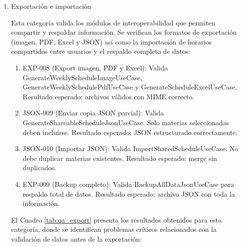 \begin{enumerate}
  Para conflictos permitidos se establece una penalización moderada de 50 puntos (ALLOWED\_CONFLICT\_PENALTY) que reduce la puntuación pero mantiene la combinación como opción válida. Adicionalmente, se aumenta el peso de la estrategia PrioritizeTeachersStrategy de 1.0 a 2.0 para que los docentes favoritos tengan mayor influencia en el ranking final.
  
  \item Exportación e importación
  
  Esta categoría valida los módulos de interoperabilidad que permiten compartir y respaldar información. Se verifican los formatos de exportación (imagen, PDF, Excel y JSON) así como la importación de horarios compartidos entre usuarios y el respaldo completo de datos:
  
  \begin{enumerate}[label=\alph*)]
    \item EXP-008 (Export imagen, PDF y Excel): Valida GenerateWeeklyScheduleImageUseCase, GenerateWeeklySchedulePdfUseCase y GenerateScheduleExcelUseCase. Resultado esperado: archivos válidos con MIME correcto.
    
    \item JSON-009 (Enviar copia JSON parcial): Valida GenerateShareableScheduleJsonUseCase. Solo materias seleccionadas deben incluirse. Resultado esperado: JSON estructurado correctamente.
    
    \item JSON-010 (Importar JSON): Valida ImportSharedScheduleUseCase. No debe duplicar materias existentes. Resultado esperado: merge sin duplicados.
    
    \item EXP-009 (Backup completo): Valida BackupAllDataJsonUseCase para respaldo total de datos. Resultado esperado: archivo JSON con toda la información.
  \end{enumerate}
  
  El Cuadro \ref{tab:qa_export} presenta los resultados obtenidos para esta categoría, donde se identifican problemas críticos relacionados con la validación de datos antes de la exportación:
  

\end{enumerate}
